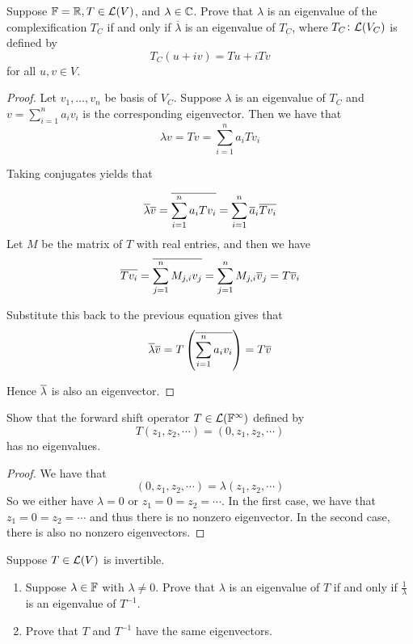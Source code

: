 \documentclass{extarticle}
\begin{document}
\begin{problem}{18}
    Suppose \(\mathbb{F} = \mathbb{R}, T \in \mathcal{L}(V)\), and \(\lambda \in \mathbb{C}\). Prove that \(\lambda\) is 
    an eigenvalue of the complexification \(T_C\) if and only if \(\overline{\lambda}\) 
    is an eigenvalue of \(T_C\), where \(T_C \colon \mathcal{L}(V_C)\) is defined by 
    \[T_C(u + iv) = Tu + iTv\]
    for all \(u, v \in V\).
\end{problem}

\begin{proof} Let \(v_1, \ldots, v_n\) be basis of \(V_C\).
Suppose \(\lambda\) is an eigenvalue of \(T_C\) and \(v = \sum_{i=1}^{n}a_i v_i\) is the 
corresponding eigenvector. Then we have that 
\[\lambda v = Tv = \sum_{i=1}^{n}a_i T v_i\] 

Taking conjugates yields that 

\[\overline{\lambda} \overline{v} = \overline{\sum_{i=1}^{n} a_i T v_i} = \sum_{i=1}^{n} \overline{a}_i \overline{T v_i}\]
Let \(M\) be the matrix of \(T\) with real entries, and then we have 
\[\overline{Tv_i} = \overline{\sum_{j=1}^{n}M_{j, i} v_j} = \sum_{j=1}^{n}M_{j, i} \overline{v}_j 
= T \overline{v}_i\]

Substitute this back to the previous equation gives that 
\[\overline{\lambda} \overline{v} = T \left(\overline{\sum_{i=1}^{n} a_i v_i}\right) = T \overline{v} \]

Hence \(\overline{\lambda}\) is also an eigenvector. 
\end{proof}

\begin{problem}{19}
    Show that the forward shift operator \(T \in \mathcal{L}(\mathbb{F}^\infty)\) defined by 
    \[T(z_1, z_2, \cdots) = (0, z_1, z_2, \cdots)\]
    has no eigenvalues. 
\end{problem}

\begin{proof}
We have that 
\[(0, z_1, z_2, \cdots) = \lambda (z_1, z_2, \cdots)\]
So we either have \(\lambda =0\) or \(z_1 = 0 = z_2 = \cdots\). In the first case, we have 
that \(z_1 = 0 = z_2 = \cdots\) and thus there is no nonzero eigenvector. In the second case, 
there is also no nonzero eigenvectors. 
\end{proof}

\begin{problem}{21}
    Suppose \(T \in \mathcal{L}(V)\) is invertible. 
    \begin{enumerate}[label=(\alph*)]
        \item Suppose \(\lambda \in \mathbb{F}\) with \(\lambda \neq 0\). Prove that 
        \(\lambda\) is an eigenvalue of \(T\) if and only if \(\frac{1}{\lambda}\) 
        is an eigenvalue of \(T^{-1}\). 

        \item Prove that \(T\) and \(T^{-1}\) have the same eigenvectors. 
    \end{enumerate}
\end{problem}
\end{document}
